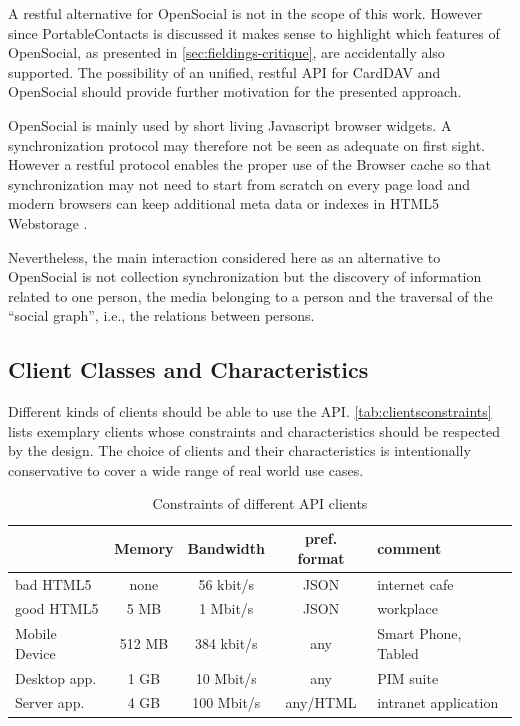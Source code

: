 \documentclass[11pt,a4paper,headsepline,twoside]{scrartcl}		%
\begin{document}
A restful alternative for OpenSocial is not in the scope of this work. However
since PortableContacts is discussed it makes sense to highlight which features
of OpenSocial, as presented in \autoref{sec:fieldings-critique}, are
accidentally also supported. The possibility of an unified, restful API for
CardDAV and OpenSocial should provide further motivation for the presented
approach.

OpenSocial is mainly used by short living Javascript browser widgets. A
synchronization protocol may therefore not be seen as adequate on first
sight. However a restful protocol enables the proper use of the Browser cache so
that synchronization may not need to start from scratch on every page load and
modern browsers can keep additional meta data or indexes in HTML5
Webstorage \cite{Hickson2011b}.

Nevertheless, the main interaction considered here as an alternative to
OpenSocial is not collection synchronization but the discovery of information
related to one person, the media belonging to a person and the traversal of the
``social graph'', i.e., the relations between persons.

\subsection{Client Classes and Characteristics}
\label{sec:user-class-char}

Different kinds of clients should be able to use the API.
\autoref{tab:clientsconstraints} lists exemplary clients whose constraints and
characteristics should be respected by the design. The choice of clients and
their characteristics is intentionally conservative to cover a wide range of
real world use cases.

\begin{table}[tbh]
  \centering
  \begin{tabular}[tbh]{ l || c | c | c | l }
                & Memory & Bandwidth & pref. format & comment \\  \hline
  bad HTML5 & none & 56 kbit/s & JSON & internet cafe\\
  good HTML5 & 5 MB & 1 Mbit/s & JSON & workplace\\
  Mobile Device &  512 MB & 384 kbit/s & any & Smart Phone, Tabled \\ 
  Desktop app. &  1 GB & 10 Mbit/s  & any & PIM suite \\
  Server app.  &  4 GB & 100 Mbit/s & any/HTML & intranet application \\
  \end{tabular}
  \caption{Constraints of different API clients}
  \label{tab:clientsconstraints}
\end{table}
\end{document}
